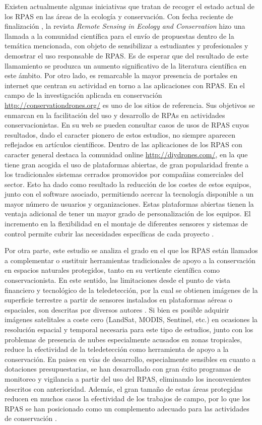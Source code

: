 \documentclass[11pt,]{article}
\begin{document}
Existen actualmente algunas iniciativas que tratan de recoger el estado
actual de los RPAS en las áreas de la ecología y conservación. Con fecha
reciente de finalización , la revista \emph{Remote Sensing in Ecology
and Conservation} hizo una llamada a la comunidad científica para el
envío de propuestas dentro de la temática mencionada, con objeto de
sensibilizar a estudiantes y profesionales y demostrar el uso
responsable de RPAS. Es de esperar que del resultado de este llamamiento
se produzca un aumento significativo de la literatura científica en este
ámbito. Por otro lado, es remarcable la mayor presencia de portales en
internet que centran su actividad en torno a las aplicaciones con RPAS.
En el campo de la investigación aplicada en conservación
\url{http://conservationdrones.org/} es uno de los sitios de referencia.
Sus objetivos se enmarcan en la facilitación del uso y desarrollo de
RPAs en actividades conservacionistas. En su web se pueden consultar
casos de usos de RPAS cuyos resultados, dado el caracter pionero de
estos estudios, no siempre aparecen reflejados en artículos científicos.
Dentro de las aplicaciones de los RPAS con caracter general destaca la
comunidad online \url{http://diydrones.com/}, en la que tiene gran
acogida el uso de plataformas abiertas, de gran popularidad frente a los
tradicionales sistemas cerrados promovidos por compañias comerciales del
sector. Esto ha dado como resultado la reducción de los costes de estos
equipos, junto con el software asociado, permitiendo acercar la
tecnología disponible a un mayor número de usuarios y organizaciones.
Estas plataformas abiertas tienen la ventaja adicional de tener un mayor
grado de personalización de los equipos. El incremento en la
flexibilidad en el montaje de diferentes sensores y sistemas de control
permite cubrir las necesidades específicas de cada proyecto
\citep{Koh2012}.

Por otra parte, este estudio se analiza el grado en el que los RPAS
están llamados a complementar o sustituir herramientas tradicionales de
apoyo a la conservación en espacios naturales protegidos, tanto en su
vertiente científica como conservacionista. En este sentido, las
limitaciones desde el punto de vista financiero y tecnológico de la
teledetección, por la cual se obtienen imágenes de la superficie
terrestre a partir de sensores instalados en plataformas aéreas o
espaciales, son descritas por diversos autores \citep{Koh2012}. Si bien
es posible adquirir imágenes satelitales a coste cero (LandSat, MODIS,
Sentinel, etc.) en ocasiones la resolución espacial y temporal necesaria
para este tipo de estudios, junto con los problemas de presencia de
nubes especialmente acusados en zonas tropicales, reduce la efectividad
de la teledetección como herramienta de apoyo a la conservación. En
paises en vías de desarrollo, especialmente sensibles en cuanto a
dotaciones presupuestarias, se han desarrollado con gran éxito programas
de monitoreo y vigilancia a partir del uso del RPAS, eliminando los
inconvenientes descritos con anterioridad. Además, el gran tamaño de
estas áreas protegidas reducen en muchos casos la efectividad de los
trabajos de campo, por lo que los RPAS se han posicionado como un
complemento adecuado para las actividades de conservación
\citep{Zahawi2015}.
\end{document}
